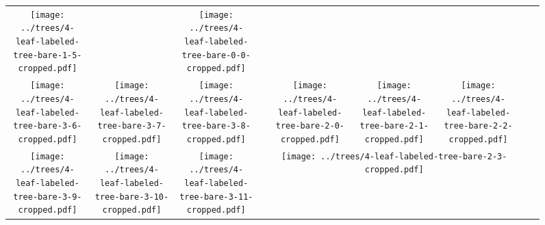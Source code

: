 \documentclass[border=10pt,varwidth=30cm]{standalone}
\newcommand{\pltwidth}{0.1}
\begin{document}
\begin{figure}
\begin{tabular}{@{}ccccccccc@{}}
        \texttt{[image: ../trees/4-leaf-labeled-tree-bare-1-5-cropped.pdf]}
        &
        &
        \texttt{[image: ../trees/4-leaf-labeled-tree-bare-0-0-cropped.pdf]}
        \\
        \texttt{[image: ../trees/4-leaf-labeled-tree-bare-3-6-cropped.pdf]}
        &
        \texttt{[image: ../trees/4-leaf-labeled-tree-bare-3-7-cropped.pdf]}
        &
        \texttt{[image: ../trees/4-leaf-labeled-tree-bare-3-8-cropped.pdf]}
        &
        &
        \texttt{[image: ../trees/4-leaf-labeled-tree-bare-2-0-cropped.pdf]}
        &
        \texttt{[image: ../trees/4-leaf-labeled-tree-bare-2-1-cropped.pdf]}
        &
        \texttt{[image: ../trees/4-leaf-labeled-tree-bare-2-2-cropped.pdf]}
        &
        &
        \\
        \texttt{[image: ../trees/4-leaf-labeled-tree-bare-3-9-cropped.pdf]}
        &
        \texttt{[image: ../trees/4-leaf-labeled-tree-bare-3-10-cropped.pdf]}
        &
        \texttt{[image: ../trees/4-leaf-labeled-tree-bare-3-11-cropped.pdf]}
        &
        &
        \multicolumn{3}{c}{\texttt{[image: ../trees/4-leaf-labeled-tree-bare-2-3-cropped.pdf]}}
        &
        &
        \\
    \end{tabular}
\end{figure}
\end{document}
